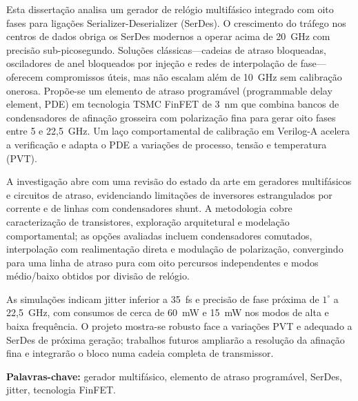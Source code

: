 Esta dissertação analisa um gerador de relógio multifásico integrado com oito fases para ligações Serializer-Deserializer (SerDes). O crescimento do tráfego nos centros de dados obriga os SerDes modernos a operar acima de 20~GHz com precisão sub-picosegundo. Soluções clássicas---cadeias de atraso bloqueadas, osciladores de anel bloqueados por injeção e redes de interpolação de fase---oferecem compromissos úteis, mas não escalam além de 10~GHz sem calibração onerosa. Propõe-se um elemento de atraso programável (programmable delay element, PDE) em tecnologia TSMC FinFET de 3~nm que combina bancos de condensadores de afinação grosseira com polarização fina para gerar oito fases entre 5 e 22{,}5~GHz. Um laço comportamental de calibração em Verilog-A acelera a verificação e adapta o PDE a variações de processo, tensão e temperatura (PVT).

A investigação abre com uma revisão do estado da arte em geradores multifásicos e circuitos de atraso, evidenciando limitações de inversores estrangulados por corrente e de linhas com condensadores shunt. A metodologia cobre caracterização de transistores, exploração arquitetural e modelação comportamental; as opções avaliadas incluem condensadores comutados, interpolação com realimentação direta e modulação de polarização, convergindo para uma linha de atraso pura com oito percursos independentes e modos médio/baixo obtidos por divisão de relógio.

As simulações indicam jitter inferior a 35~fs e precisão de fase próxima de $1^{\circ}$ a 22{,}5~GHz, com consumos de cerca de 60~mW e 15~mW nos modos de alta e baixa frequência. O projeto mostra-se robusto face a variações PVT e adequado a SerDes de próxima geração; trabalhos futuros ampliarão a resolução da afinação fina e integrarão o bloco numa cadeia completa de transmissor.

\medskip
\noindent\textbf{Palavras-chave:} gerador multifásico, elemento de atraso programável, SerDes, jitter, tecnologia FinFET.
